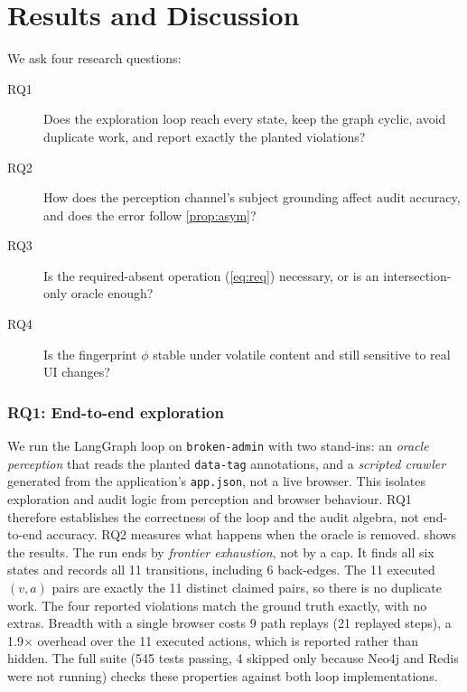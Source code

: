 \section{Results and Discussion}
\label{sec:eval}

We ask four research questions:
\begin{description}
  \item[RQ1] Does the exploration loop reach every state, keep the graph
    cyclic, avoid duplicate work, and report exactly the planted violations?
  \item[RQ2] How does the perception channel's subject grounding affect audit
    accuracy, and does the error follow \cref{prop:asym}?
  \item[RQ3] Is the required-absent operation (\cref{eq:req}) necessary, or is
    an intersection-only oracle enough?
  \item[RQ4] Is the fingerprint $\phi$ stable under volatile content and still
    sensitive to real UI changes?
\end{description}



\subsubsection{RQ1: End-to-end exploration}
\label{sec:eval:rq1}

We run the LangGraph loop on \texttt{broken-admin} with two stand-ins: an
\emph{oracle perception} that reads the planted \texttt{data-tag} annotations,
and a \emph{scripted crawler} generated from the application's
\texttt{app.json}, not a live browser. This isolates exploration and audit
logic from perception and browser behaviour. RQ1 therefore establishes the
correctness of the loop and the audit algebra, not end-to-end accuracy. RQ2
measures what happens when the oracle is removed.  shows the results. The run
ends by \emph{frontier exhaustion}, not by a cap. It finds all six states and
records all 11 transitions, including 6 back-edges. The 11 executed
$(v,a)$ pairs are exactly the 11 distinct claimed pairs, so there is no
duplicate work. The four reported violations match the ground truth exactly,
with no extras. Breadth with a single browser costs 9 path replays
(21 replayed steps), a 1.9$\times$ overhead over the 11 executed actions,
which is reported rather than hidden. The full suite (545 tests passing,
4 skipped only because Neo4j and Redis were not running) checks these
properties against both loop implementations.

